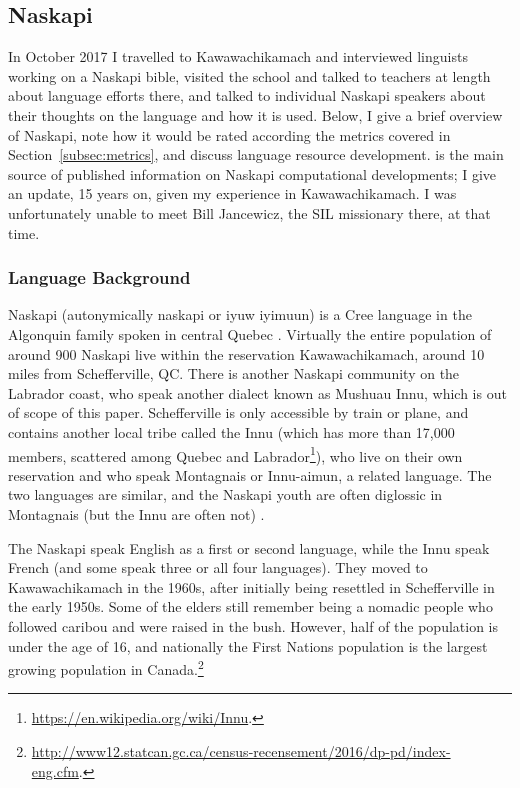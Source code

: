 
\subsection{Naskapi}
\label{sec:naskapi}

In October 2017 I travelled to Kawawachikamach and interviewed linguists working on a Naskapi bible, visited the school and talked to teachers at length about language efforts there, and talked to individual Naskapi speakers about their thoughts on the language and how it is used. Below, I give a brief overview of Naskapi, note how it would be rated according the metrics covered in Section~\ref{subsec:metrics}, and discuss language resource development. \citet{jancewicz2002applied} is the main source of published information on Naskapi computational developments; I give an update, 15 years on, given my experience in Kawawachikamach. I was unfortunately unable to meet Bill Jancewicz, the SIL missionary there, at that time.

\subsubsection{Language Background}
\label{sec:naskapi-language-background}

Naskapi (autonymically  naskapi or  iyuw iyimuun) is a Cree language in the Algonquin family spoken in central Quebec \citep{MacKenzie-and-Jancewicz-1994}. Virtually the entire population of around 900 Naskapi live within the reservation Kawawachikamach, around 10 miles from Schefferville, QC. There is another Naskapi community on the Labrador coast, who speak another dialect known as Mushuau Innu, which is out of scope of this paper. Schefferville is only accessible by train or plane, and contains another local tribe called the Innu (which has more than 17,000 members, scattered among Quebec and Labrador\footnote{\href{https://en.wikipedia.org/wiki/Innu}{https://en.wikipedia.org/wiki/Innu}. }), who live on their own reservation and who speak Montagnais or Innu-aimun, a related language. The two languages are similar, and the Naskapi youth are often diglossic in Montagnais (but the Innu are often not) \cite{macKenzie1980towards}.

The Naskapi speak English as a first or second language, while the Innu speak French (and some speak three or all four languages). They moved to Kawawachikamach in the 1960s, after initially being resettled in Schefferville in the early 1950s. Some of the elders still remember being a nomadic people who followed caribou and were raised in the bush. However, half of the population is under the age of 16, and nationally the First Nations population is the largest growing population in Canada.\footnote{\href{http://www12.statcan.gc.ca/census-recensement/2016/dp-pd/index-eng.cfm}{http://www12.statcan.gc.ca/census-recensement/2016/dp-pd/index-eng.cfm}. }

